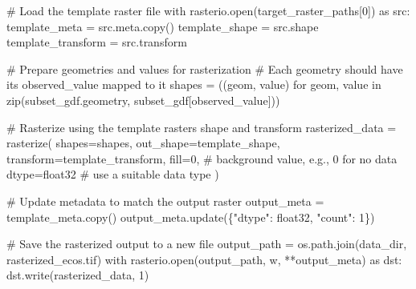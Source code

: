 \documentclass[
  letterpaper,
]{article}
\newenvironment{Shaded}{\begin{snugshade}}{\end{snugshade}}
\newcommand{\BuiltInTok}[1]{\textcolor[rgb]{0.00,0.23,0.31}{#1}}
\newcommand{\CommentTok}[1]{\textcolor[rgb]{0.37,0.37,0.37}{#1}}
\newcommand{\ControlFlowTok}[1]{\textcolor[rgb]{0.00,0.23,0.31}{#1}}
\newcommand{\DecValTok}[1]{\textcolor[rgb]{0.68,0.00,0.00}{#1}}
\newcommand{\ImportTok}[1]{\textcolor[rgb]{0.00,0.46,0.62}{#1}}
\newcommand{\KeywordTok}[1]{\textcolor[rgb]{0.00,0.23,0.31}{#1}}
\newcommand{\NormalTok}[1]{\textcolor[rgb]{0.00,0.23,0.31}{#1}}
\newcommand{\OperatorTok}[1]{\textcolor[rgb]{0.37,0.37,0.37}{#1}}
\newcommand{\StringTok}[1]{\textcolor[rgb]{0.13,0.47,0.30}{#1}}
\begin{document}
\begin{Shaded}
\begin{Highlighting}[]
\CommentTok{\# Load the template raster file}
\ControlFlowTok{with}\NormalTok{ rasterio.}\BuiltInTok{open}\NormalTok{(target\_raster\_paths[}\DecValTok{0}\NormalTok{]) }\ImportTok{as}\NormalTok{ src:}
\NormalTok{    template\_meta }\OperatorTok{=}\NormalTok{ src.meta.copy()}
\NormalTok{    template\_shape }\OperatorTok{=}\NormalTok{ src.shape}
\NormalTok{    template\_transform }\OperatorTok{=}\NormalTok{ src.transform}

\CommentTok{\# Prepare geometries and values for rasterization}
\CommentTok{\# Each geometry should have its \textquotesingle{}observed\_value\textquotesingle{} mapped to it}
\NormalTok{shapes }\OperatorTok{=}\NormalTok{ ((geom, value) }\ControlFlowTok{for}\NormalTok{ geom, value }\KeywordTok{in} \BuiltInTok{zip}\NormalTok{(subset\_gdf.geometry, subset\_gdf[}\StringTok{\textquotesingle{}observed\_value\textquotesingle{}}\NormalTok{]))}

\CommentTok{\# Rasterize using the template raster\textquotesingle{}s shape and transform}
\NormalTok{rasterized\_data }\OperatorTok{=}\NormalTok{ rasterize(}
\NormalTok{    shapes}\OperatorTok{=}\NormalTok{shapes,}
\NormalTok{    out\_shape}\OperatorTok{=}\NormalTok{template\_shape,}
\NormalTok{    transform}\OperatorTok{=}\NormalTok{template\_transform,}
\NormalTok{    fill}\OperatorTok{=}\DecValTok{0}\NormalTok{,  }\CommentTok{\# background value, e.g., 0 for no data}
\NormalTok{    dtype}\OperatorTok{=}\StringTok{\textquotesingle{}float32\textquotesingle{}}  \CommentTok{\# use a suitable data type}
\NormalTok{)}

\CommentTok{\# Update metadata to match the output raster}
\NormalTok{output\_meta }\OperatorTok{=}\NormalTok{ template\_meta.copy()}
\NormalTok{output\_meta.update(\{}\StringTok{"dtype"}\NormalTok{: }\StringTok{\textquotesingle{}float32\textquotesingle{}}\NormalTok{, }\StringTok{"count"}\NormalTok{: }\DecValTok{1}\NormalTok{\})}

\CommentTok{\# Save the rasterized output to a new file}
\NormalTok{output\_path }\OperatorTok{=}\NormalTok{ os.path.join(data\_dir, }\StringTok{\textquotesingle{}rasterized\_ecos.tif\textquotesingle{}}\NormalTok{)}
\ControlFlowTok{with}\NormalTok{ rasterio.}\BuiltInTok{open}\NormalTok{(output\_path, }\StringTok{\textquotesingle{}w\textquotesingle{}}\NormalTok{, }\OperatorTok{**}\NormalTok{output\_meta) }\ImportTok{as}\NormalTok{ dst:}
\NormalTok{    dst.write(rasterized\_data, }\DecValTok{1}\NormalTok{)}
\end{Highlighting}
\end{Shaded}
\end{document}
